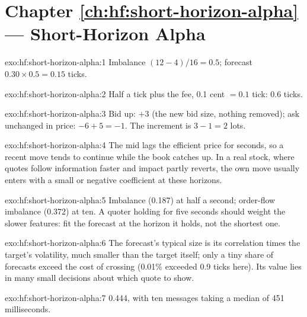 \section*{Chapter \ref{ch:hf:short-horizon-alpha} --- Short-Horizon Alpha}

\begin{solution}{exo:hf:short-horizon-alpha:1}
Imbalance $(12-4)/16=0.5$; forecast $0.30\times0.5=0.15$ ticks.
\end{solution}

\begin{solution}{exo:hf:short-horizon-alpha:2}
Half a tick plus the fee, 0.1 cent $=0.1$ tick: 0.6 ticks.
\end{solution}

\begin{solution}{exo:hf:short-horizon-alpha:3}
Bid up: $+3$ (the new bid size, nothing removed); ask unchanged in price: $-6+5=-1$. The increment is $3-1=2$ lots.
\end{solution}

\begin{solution}{exo:hf:short-horizon-alpha:4}
The mid lags the efficient price for seconds, so a recent move tends to continue while the book catches up. In a real stock, where quotes follow
information faster and impact partly reverts, the own move usually enters with a small or negative coefficient at these horizons.
\end{solution}

\begin{solution}{exo:hf:short-horizon-alpha:5}
Imbalance (0.187) at half a second; order-flow imbalance (0.372) at ten. A quoter holding for five seconds should weight the slower features:
fit the forecast at the horizon it holds, not the shortest one.
\end{solution}

\begin{solution}{exo:hf:short-horizon-alpha:6}
The forecast's typical size is its correlation times the target's volatility, much smaller than the target itself; only a tiny share of forecasts
exceed the cost of crossing (0.01\% exceeded 0.9 ticks here). Its value lies in many small decisions about which quote to show.
\end{solution}

\begin{solution}{exo:hf:short-horizon-alpha:7}
0.444, with ten messages taking a median of 451 milliseconds.
\end{solution}

